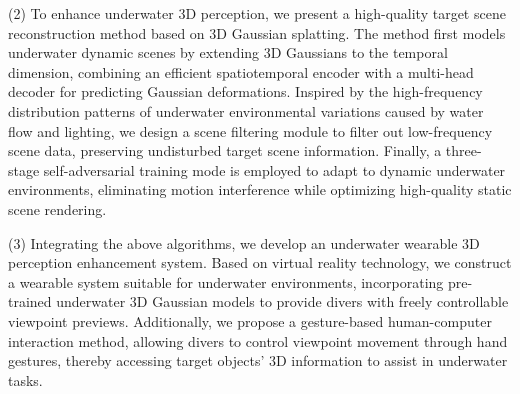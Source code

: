 \begin{abstract*}
(2) To enhance underwater 3D perception, we present a high-quality target scene reconstruction method based on 3D Gaussian splatting. 
The method first models underwater dynamic scenes by extending 3D Gaussians to the temporal dimension, combining an efficient spatiotemporal encoder with a multi-head decoder for predicting Gaussian deformations. 
Inspired by the high-frequency distribution patterns of underwater environmental variations caused by water flow and lighting, we design a scene filtering module to filter out low-frequency scene data, 
preserving undisturbed target scene information. Finally, a three-stage self-adversarial training mode is employed to adapt to dynamic underwater environments, 
eliminating motion interference while optimizing high-quality static scene rendering.

(3) Integrating the above algorithms, we develop an underwater wearable 3D perception enhancement system. 
Based on virtual reality technology, we construct a wearable system suitable for underwater environments, incorporating pre-trained underwater 3D Gaussian models to provide divers with freely controllable viewpoint previews. 
Additionally, we propose a gesture-based human-computer interaction method, allowing divers to control viewpoint movement through hand gestures, thereby accessing target objects' 3D information to assist in underwater tasks.
\end{abstract*}
